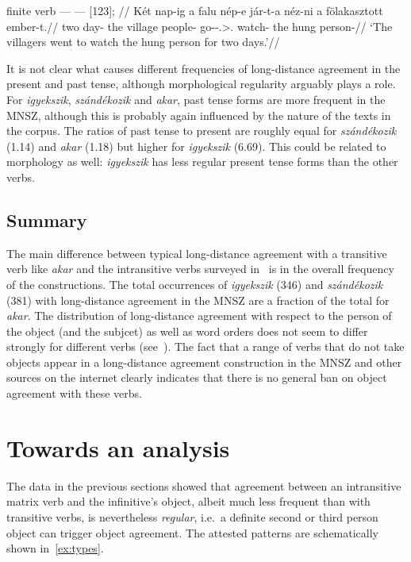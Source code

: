 \ex\label{ex:jarta-nezni}
    \begingl
        \glpreamble finite verb --- \Inf{} --- \Obj{} [123]; //
        \gla 	Két nap-ig a falu nép-e jár-t-a néz-ni a fölakasztott ember-t.//
        \glb 	two day-\Term{} the village people-\Tsg{} go-\Pst-\Tsg.\Sbj>\Third.\Obj{} watch-\Inf{} the hung person-\Acc{}//
        \glft 	\enquote*{The villagers went to watch the hung person for two days.}//
    \endgl
\xe

It is not clear what causes different frequencies of long-distance agreement in
the present and past tense, although morphological regularity arguably plays a
role. For \emph{igyekszik}, \emph{szándékozik} and \emph{akar}, past tense
forms are more frequent in the \gls{MNSZ}, although this is probably again
influenced by the nature of the texts in the corpus. The ratios of past tense
to present are roughly equal for \emph{szándékozik} (1.14) and \emph{akar}
(1.18) but higher for \emph{igyekszik} (6.69). This could be related to
morphology as well: \emph{igyekszik} has less regular present tense forms
than the other verbs.

\subsection{Summary}\label{sub:summary}

The main difference between typical long-distance agreement with a transitive
verb like \emph{akar} and the intransitive verbs surveyed in~ is
in the overall frequency of the constructions. The total occurrences of
\emph{igyekszik} (346) and \emph{szándékozik} (381) with long-distance
agreement in the \gls{MNSZ} are a fraction of the total for \emph{akar}. The
distribution of long-distance agreement with respect to the person of the
object (and the subjcet) as well as word orders does not seem to differ
strongly for different verbs
(see~).
%
The fact that a range of verbs that do not take \Acc{} objects appear in a
long-distance agreement construction in the \gls{MNSZ} and other sources on the
internet clearly indicates that there is no general ban on object agreement
with these verbs.

\section{Towards an analysis}\label{sec:analysis}

The data in the previous sections showed that agreement between an intransitive
matrix verb and the infinitive's object, albeit much less frequent than with
transitive verbs, is nevertheless \emph{regular}, i.e.\ a definite second or
third person object can trigger object agreement. The attested patterns are
schematically shown in~\eqref{ex:types}.


